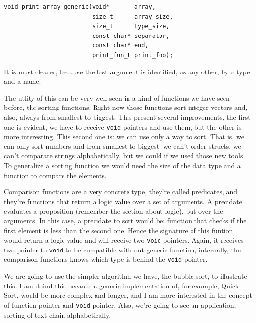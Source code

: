 \documentclass[a4paper]{article}
\begin{document}
\noindent
\begin{minipage}[H]{\linewidth}
\mbox{}
\begin{lstlisting}[style=C,
caption={Ejemplo final de función que recibe un puntero},
label={lst:finalPointerFunction}]
void print_array_generic(void*       array,
                         size_t      array_size,
                         size_t      type_size,
                         const char* separator,
                         const char* end,
                         print_fun_t print_foo);
\end{lstlisting}
\end{minipage}
It is must clearer, because the last argument is identified, as any other, by
a type and a name.

The utlity of this can be very well seen in a kind of functions we have seen
before, the sorting functions. Right now those functions sort integer vectors
and, also, always from smallest to biggest. This present several improvements,
the first one is evident, we have to receive \verb!void! pointers and use them,
but the other is more interesting. This second one is: we can use only a way to
sort. That is, we can only sort numbers and from smallest to biggest, we can't
order structs, we can't comparate strings alphabetically, but we could if we
used those new tools. To generalize a sorting function we would need the size of
the data type and a function to compare the elements.

Comparison functions are a very concrete type, they're called predicates, and
they're functions that return a logic value over a set of arguments. A precidate
evaluates a proposition (remember the section about logic), but over the
arguments. In this case, a precidate to sort would be: function that checks if
the first element is less than the second one. Hence the signature of this
funtion would return a logic value and will receive two \verb!void! pointers.
Again, it receives two pointer to \verb!void! to be compatible with out generic
function, internally, the comparison functions knows which type is behind the
\verb!void! pointer.

We are going to use the simpler algorithm we have, the bubble sort, to
illustrate this. I am doind this because a generic implementation of, for
example, Quick Sort, would be more complex and longer, and I am more interested
in the concept of function pointer and \verb!void! pointer. Also, we're going to
see an application, sorting of text chain alphabetically.
\end{document}
